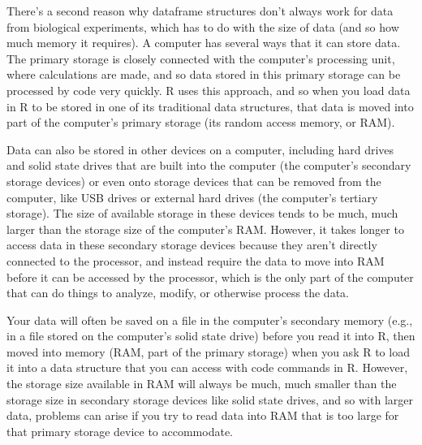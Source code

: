 \documentclass[]{tufte-book}
\begin{document}
There's a second reason why dataframe structures don't always work for data from
biological experiments, which has to do with the size of data (and so how much
memory it requires). A computer has several ways that it can store data. The
primary storage is closely connected with the computer's processing unit, where
calculations are made, and so data stored in this primary storage can be
processed by code very quickly. R uses this approach, and so when you load data
in R to be stored in one of its traditional data structures, that data is
moved into part of the computer's primary storage (its random access memory, or
RAM).

Data can also be stored in other devices on a computer, including hard drives and
solid state drives that are built into the computer (the computer's secondary
storage devices) or even onto storage devices that can be removed from the
computer, like USB drives or external hard drives (the computer's tertiary storage).
The size of available storage in these devices tends to be much, much larger than
the storage size of the computer's RAM. However, it takes longer to access data
in these secondary storage devices because they aren't directly connected to
the processor, and instead require the data to move into RAM before it can
be accessed by the processor, which is the only part of the computer that can
do things to analyze, modify, or otherwise process the data.

Your data will often be saved on a file in the computer's secondary memory
(e.g., in a file stored on the computer's solid state drive) before you read it
into R, then moved into memory (RAM, part of the primary storage) when you ask
R to load it into a data structure that you can access with code commands in R.
However, the storage size available in RAM will always be much, much smaller than
the storage size in secondary storage devices like solid state drives, and so
with larger data, problems can arise if you try to read data into RAM that is
too large for that primary storage device to accommodate.
\end{document}
